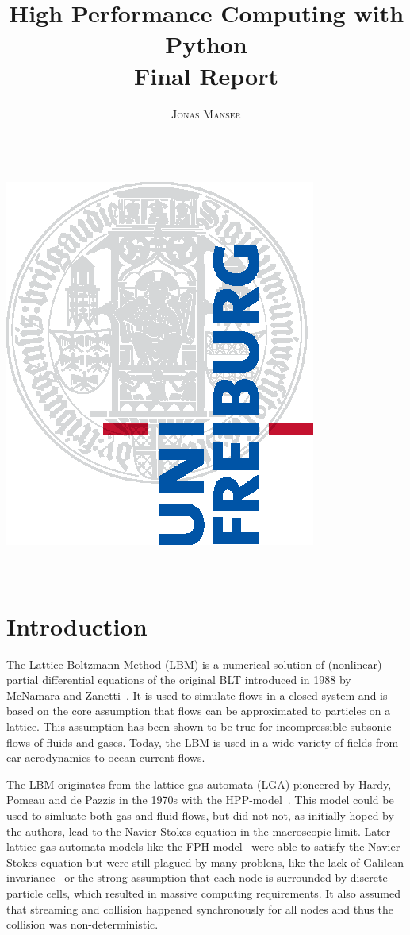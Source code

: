 \documentclass[a4paper,11pt]{article}
\title{\Huge \textbf{High Performance Computing with Python} \vspace{4mm} \\ \huge Final Report}
\author{\textsc{Jonas Manser} \\ \vspace{3mm}\text{4953222}  \\
\vspace{3mm}\text{jonas.burster@gmail.com}}
\begin{document}
\makeatletter
\begin{titlepage}
  \begin{center}
    \includegraphics[width=0.5\linewidth]{logos/Uni_Logo-Grundversion_E1_A4_CMYK.eps}\\[4ex]
    {\huge \bfseries  \@title }\\[2ex]
    {\LARGE  \@author}\\[30ex]
    {\large \@date}
  \end{center}
\end{titlepage}
\makeatother
\thispagestyle{empty}
\newpage


\tableofcontents
\clearpage


\section{Introduction}
The Lattice Boltzmann Method (LBM) is a numerical solution of (nonlinear) partial differential equations of the original BLT introduced in 1988 by McNamara and Zanetti~\cite{mcnamara1988boltzmann-method}.
It is used to simulate flows in a closed system and is based on the core assumption that flows can be approximated to particles on a lattice.
This assumption has been shown to be true for incompressible subsonic flows of fluids and gases.
Today, the LBM is used in a wide variety of fields from car aerodynamics to ocean current flows.

The LBM originates from the lattice gas automata (LGA) pioneered by Hardy, Pomeau and de Pazzis in the 1970s with the HPP-model~\cite{hardy1973timeHPP}.
This model could be used to simluate both gas and fluid flows, but did not not, as initially hoped by the authors, lead to the Navier-Stokes equation in the macroscopic limit.
Later lattice gas automata models like the FPH-model~\cite{PhysRevLett.56.1505-fhp} were able to satisfy the Navier-Stokes equation but were still plagued by many problens, like the lack of Galilean invariance~\cite{nie2008galileanInvariance} or the strong assumption
that each node is surrounded by discrete particle cells, which resulted in massive computing requirements.
It also assumed that streaming and collision happened synchronously for all nodes and thus the collision was non-deterministic.
\end{document}
